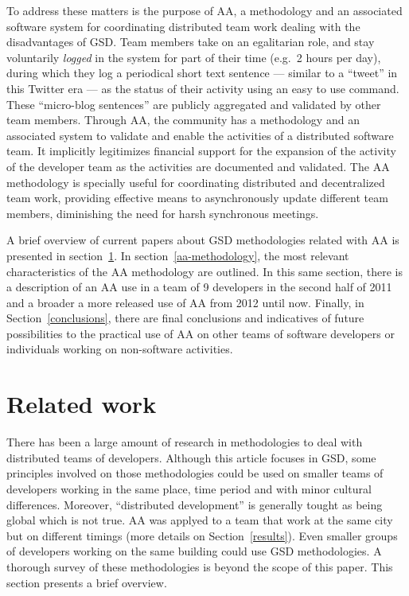 \documentclass[letterpaper]{article}
\newcommand{\indraftnote}[1]{\textcolor{blue}{\texttt{\footnotesize[#1]}}}
\newcommand{\todo}[1]{\indraftnote{todo: #1}}
\begin{document}
To address these matters is the purpose of AA, a methodology and an associated
software system for coordinating distributed team work dealing with the
disadvantages of GSD. Team members take on an egalitarian role, and stay
voluntarily \textit{logged} in the system for part of their time (e.g.\ 2 hours
per day), during which they log a periodical short text sentence --- similar to
a ``tweet'' in this Twitter era --- as the status of their activity using an
easy to use command. These ``micro-blog sentences'' are publicly aggregated and
validated by other team members. Through AA, the community has a methodology and
an associated system to validate and enable the activities of a distributed
software team. It implicitly legitimizes financial support for the expansion of
the activity of the developer team as the activities are documented and
validated.  The AA methodology is specially useful for coordinating distributed
and decentralized team work, providing effective means to asynchronously update
different team members, diminishing the need for harsh synchronous meetings.


A brief overview of current papers about GSD methodologies related with AA is
presented in section~\ref{related-work}. In section~\ref{aa-methodology}, the
most relevant characteristics of the AA methodology are outlined. In this same
section, there is a description of an AA use in a team of 9 developers in the
second half of 2011 and a broader a more released use of AA from 2012 until
now. Finally, in Section~\ref{conclusions}, there are final conclusions and
indicatives of future possibilities to the practical use of AA on other teams of
software developers or individuals working on non-software activities.

\section{Related work}
\label{related-work}



There has been a large amount of research in methodologies to
deal with distributed teams of developers. Although this article focuses in GSD,
some principles involved on those methodologies could be used on smaller teams
of developers working in the same place, time period and with minor cultural
differences. Moreover, ``distributed development'' is generally tought as being
global which is not true. AA was applyed to a team that work at the
same city but on different timings (more details on Section~\ref{results}). Even
smaller groups of developers working on the same building could use GSD
methodologies. A thorough survey of these methodologies is beyond the scope of
this paper. This section presents a brief overview.
\end{document}
